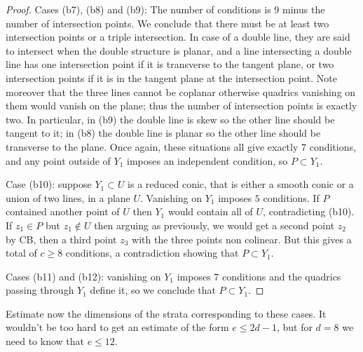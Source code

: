 \documentclass{amsart}
\theoremstyle{plain}
\numberwithin{equation}{section}
\begin{document}
\begin{proof}
Cases (b7), (b8) and (b9): The number of conditions is $9$ minus the number of intersection points.
We conclude that there must be at least two intersection points or a triple intersection. 
In case of a double line, they are said to intersect when the double structure is 
planar, and a line intersecting a double line has one intersection point if it is
transverse to the tangent plane, or two intersection points if it is in the tangent plane
at the intersection point. Note moreover 
that the three lines cannot be coplanar otherwise quadrics vanishing
on them would vanish on the plane; thus the number of intersection points is exactly two. 
In particular, in (b9) the double line is skew so the other line should be tangent
to it; in (b8) the double line is planar so the other line should be transverse to the plane.
Once again, these situations all give exactly $7$ conditions, and any point outside
of $Y_1$ imposes an independent condition, so $P\subset Y_1$. 

Case (b10): suppose $Y_1\subset U$ is a reduced conic, that is either a smooth conic
or a union of two lines, in a plane $U$. Vanishing on $Y_1$ imposes $5$ conditions. 
If $P$ contained another point of $U$ then
$Y_1$ would contain all of $U$, contradicting (b10). If $z_1\in P$ but $z_1\not \in U$
then arguing as previously, we would get a second point $z_2$ by CB, then a third
point $z_3$ with the three points non colinear.  But this gives a total of $c\geq 8$ 
conditions, a contradiction showing that $P\subset Y_1$.

Cases (b11) and (b12): vanishing on $Y_1$ imposes $7$ conditions and the quadrics passing through
$Y_1$ define it, so we conclude that $P\subset Y_1$. 
\end{proof}

Estimate now the dimensions of the strata corresponding to these cases. 
It wouldn't be too hard to get an estimate of the form $e\leq 2d-1$, but for 
$d=8$ we need to know that $e\leq 12$. 
\end{document}
